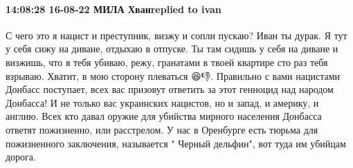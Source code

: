  
 
 
 
 

\paragraph{14:08:28 16-08-22 МИЛА Хванreplied to ivan}

С чего это я нацист и преступник, визжу и сопли пускаю? Иван ты дурак. Я тут у
себя сижу на диване, отдыхаю в отпуске. Ты там сидишь у себя на диване и
визжишь, что я тебя убиваю, режу, гранатами в твоей квартире сто раз тебя
взрываю. Хватит, в мою сторону плеваться 😆👎. Правильно с вами нацистами
Донбасс поступает, всех вас призовут ответить за этот генноцид над народом
Донбасса! И не только вас украинских нацистов, но и запад, и америку, и англию.
Всех кто давал оружие для убийства мирного населения Донбасса ответят
пожизненно, или расстрелом. У нас в Оренбурге есть тюрьма для пожизненного
заключения, называется " Черный дельфин", вот туда им убийцам дорога.











